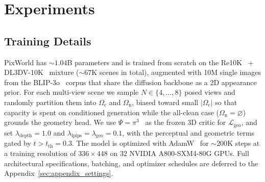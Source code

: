 \section{Experiments}









\subsection{Training Details}
PixWorld has $\sim\!1.04$B parameters and is trained from scratch on the Re10K~\citep{zhou2018stereo} + DL3DV-10K~\citep{ling2024dl3dv} mixture ($\sim\!67$K scenes in total), augmented with 10M single images from the BLIP-3o~\citep{chen2025blip3} corpus that share the diffusion backbone as a 2D appearance prior. For each multi-view scene we sample $N\!\in\!\{4,\ldots,8\}$ posed views and randomly partition them into $\Omega_{\mathrm c}$ and $\Omega_{\mathrm n}$, biased toward small $|\Omega_{\mathrm c}|$ so that capacity is spent on conditioned generation while the all-clean case ($\Omega_{\mathrm n}\!=\!\varnothing$) grounds the geometry head. We use $\Psi{=}\text{$\pi^3$}$~\citep{wang2025pi} as the frozen 3D critic for $\mathcal{L}_{\mathrm{geo}}$, and set $\lambda_{\mathrm{depth}}{=}1.0$ and $\lambda_{\mathrm{lpips}}{=}\lambda_{\mathrm{geo}}{=}0.1$, with the perceptual and geometric terms gated by $t{>}t_{\mathrm{th}}{=}0.3$. The model is optimized with AdamW~\citep{loshchilov2017decoupled} for $\sim\!200$K steps at a training resolution of $336\!\times\!448$ on $32$ NVIDIA A800-SXM4-80G GPUs. Full architectural specifications, batching, and optimizer schedules are deferred to the Appendix~\ref{sec:appendix_settings}.


